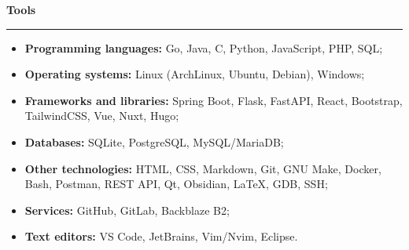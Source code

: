 {\vspace{0.5cm} \hspace{-0.5cm} \Large \textbf{Tools}}
\par\noindent\rule{\textwidth}{0.1mm}

\begin{itemize}
    \item \textbf{Programming languages:} Go, Java, C, Python, JavaScript, PHP, SQL;
    \item \textbf{Operating systems:} Linux (ArchLinux, Ubuntu, Debian), Windows;
    \item \textbf{Frameworks and libraries:} Spring Boot, Flask, FastAPI, React, Bootstrap, TailwindCSS, Vue, Nuxt, Hugo;
    \item \textbf{Databases:} SQLite, PostgreSQL, MySQL/MariaDB;
    \item \textbf{Other technologies:} HTML, CSS, Markdown, Git, GNU Make, Docker, Bash, Postman,
        REST API, Qt, Obsidian, \LaTeX, GDB, SSH;
    \item \textbf{Services:} GitHub, GitLab, Backblaze B2; 
    \item \textbf{Text editors:} VS Code, JetBrains, Vim/Nvim, Eclipse.
\end{itemize}
